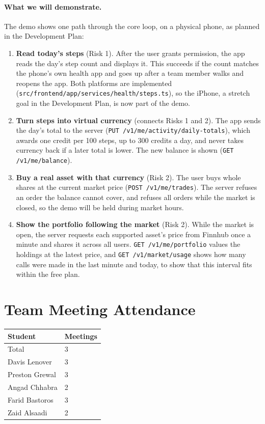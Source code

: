 \documentclass{article}
\begin{document}
\paragraph{What we will demonstrate.} The demo shows one path through the core
loop, on a physical phone, as planned in the Development Plan:

\begin{enumerate}
\item \textbf{Read today's steps} (Risk 1). After the user grants permission,
  the app reads the day's step count and displays it. This succeeds if the
  count matches the phone's own health app and goes up after a team member
  walks and reopens the app. Both platforms are implemented
  (\texttt{src/frontend/app/services/health/steps.ts}), so the iPhone, a
  stretch goal in the Development Plan, is now part of the demo.
\item \textbf{Turn steps into virtual currency} (connects Risks 1 and 2). The
  app sends the day's total to the server
  (\texttt{PUT /v1/me/activity/daily-totals}), which awards one credit per 100
  steps, up to 300 credits a day, and never takes currency back if a later
  total is lower. The new balance is shown (\texttt{GET /v1/me/balance}).
\item \textbf{Buy a real asset with that currency} (Risk 2). The user buys
  whole shares at the current market price (\texttt{POST /v1/me/trades}). The
  server refuses an order the balance cannot cover, and refuses all orders
  while the market is closed, so the demo will be held during market hours.
\item \textbf{Show the portfolio following the market} (Risk 2). While the
  market is open, the server requests each supported asset's price from
  Finnhub once a minute and shares it across all users.
  \texttt{GET /v1/me/portfolio} values the holdings at the latest price, and
  \texttt{GET /v1/market/usage} shows how many calls were made in the last
  minute and today, to show that this interval fits within the free plan.
\end{enumerate}

\section{Team Meeting Attendance}

\begin{table}[H]
\centering
\begin{tabular}{ll}
\toprule
\textbf{Student} & \textbf{Meetings}\\
\midrule
Total & 3\\
Davis Lenover & 3\\
Preston Grewal & 3\\
Angad Chhabra & 2\\
Farid Bastoros & 3\\
Zaid Alsaadi & 2\\
\bottomrule
\end{tabular}
\end{table}
\end{document}
